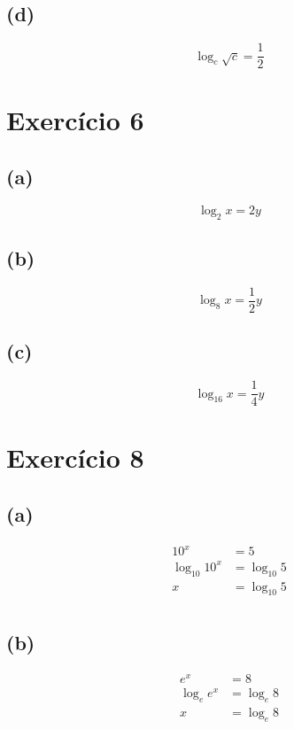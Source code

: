 \documentclass{article}
\begin{document}
\subsection*{(d)}
\begin{equation}
	\log_c \sqrt{c} = \dfrac{1}{2} 
\end{equation}

\section{Exercício 6}
\subsection*{(a)}
\begin{equation}
	\log_2 x = 2y
\end{equation}

\subsection*{(b)}
\begin{equation}
	\log_8 x = \dfrac{1}{2}y
\end{equation}

\subsection*{(c)}
\begin{equation}
	\log_{16} x = \dfrac{1}{4}y
\end{equation}


\section{Exercício 8}
\subsection*{(a)}
\begin{equation}
\begin{split}
	10^x & = 5\\
	\log_{10}10^x & = \log_{10}5\\
	 x & = \log_{10}5\\
\end{split}
\end{equation}

\subsection*{(b)}
\begin{equation}
\begin{split}
	e^x & = 8\\
	\log_{e}e^x & = \log_{e}8\\
	 x & = \log_{e}8\\
\end{split}
\end{equation}
\end{document}
